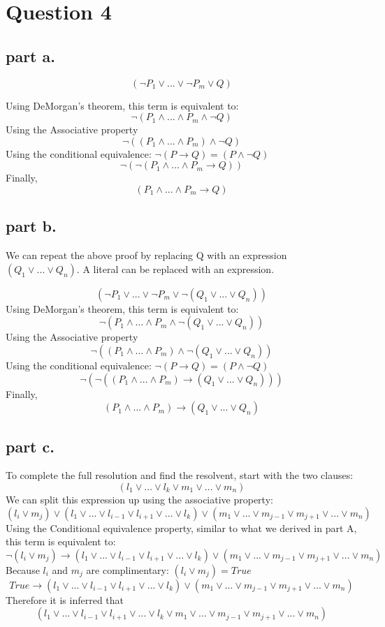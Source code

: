 \section{Question 4}

\subsection{part a.}
\[
(\neg P_1 \lor ... \lor \neg P_m \lor Q)
\]

Using DeMorgan's theorem, this term is equivalent to:
\[
\neg(P_1 \land ... \land P_m \land \neg Q)
\]
Using the Associative property
\[
\neg((P_1 \land ... \land P_m) \land \neg Q)
\]
Using the conditional equivalence: $\neg(P \to Q) = (P \land \neg Q)$
\[
\neg(\neg(P_1 \land ... \land P_m \to Q))
\]
Finally,
\[
(P_1 \land ... \land P_m \to Q)
\]

\subsection{part b.}
We can repeat the above proof by replacing Q with an expression $(Q_1 \lor ... \lor Q_n)$. A literal can be replaced with an expression. 

\[
(\neg P_1 \lor ... \lor \neg P_m \lor \neg (Q_1 \lor ... \lor Q_n))
\]
Using DeMorgan's theorem, this term is equivalent to:
\[
\neg(P_1 \land ... \land P_m \land \neg (Q_1 \lor ... \lor Q_n))
\]
Using the Associative property
\[
\neg((P_1 \land ... \land P_m) \land \neg (Q_1 \lor ... \lor Q_n))
\]
Using the conditional equivalence: $\neg(P \to Q) = (P \land \neg Q)$
\[
\neg(\neg((P_1 \land ... \land P_m) \to (Q_1 \lor ... \lor Q_n)))
\]
Finally,
\[
(P_1 \land ... \land P_m) \to (Q_1 \lor ... \lor Q_n)
\]

\subsection{part c.}
To complete the full resolution and find the resolvent, start with the two clauses:
\[
(l_1 \lor ... \lor l_k \lor m_1 \lor ... \lor m_n)
\]
We can split this expression up using the associative property:
\[
(l_i \lor m_j) \lor (l_1 \lor ... \lor l_{i-1} \lor l_{i+1} \lor ... \lor l_k) \lor (m_1 \lor ... \lor m_{j-1} \lor m_{j+1} \lor ...  \lor m_n)  
\]
Using the Conditional equivalence property, similar to what we derived in part A, this term is equivalent to:
\[
\neg(l_i \lor m_j) \to (l_1 \lor ... \lor l_{i-1} \lor l_{i+1} \lor ... \lor l_k) \lor (m_1 \lor ... \lor m_{j-1} \lor m_{j+1} \lor ...  \lor m_n)  
\]
Because $l_i$ and $m_j$ are complimentary:
$(l_i \lor m_j) = True$
\[
True \to (l_1 \lor ... \lor l_{i-1} \lor l_{i+1} \lor ... \lor l_k) \lor (m_1 \lor ... \lor m_{j-1} \lor m_{j+1} \lor ...  \lor m_n)  
\]
Therefore it is inferred that  
\[
(l_1 \lor ... \lor l_{i-1} \lor l_{i+1} \lor ... \lor l_k \lor m_1 \lor ... \lor m_{j-1} \lor m_{j+1} \lor ...  \lor m_n)
\]